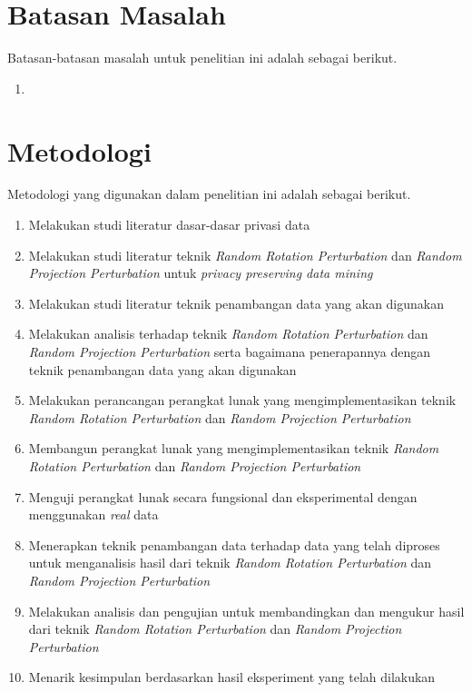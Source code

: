 \section{Batasan Masalah}
\label{sec:batasan}
Batasan-batasan masalah untuk penelitian ini adalah sebagai berikut.
\begin{enumerate}
    \item 
\end{enumerate}


\section{Metodologi}
\label{sec:metlit}
Metodologi yang digunakan dalam penelitian ini adalah sebagai berikut.
\begin{enumerate}
    \item Melakukan studi literatur dasar-dasar privasi data
    \item Melakukan studi literatur teknik \textit{Random Rotation Perturbation} dan \textit{Random Projection Perturbation} untuk \textit{privacy preserving data mining}
    \item Melakukan studi literatur teknik penambangan data yang akan digunakan
    \item Melakukan analisis terhadap teknik \textit{Random Rotation Perturbation} dan \textit{Random Projection Perturbation} serta bagaimana penerapannya dengan teknik penambangan data yang akan digunakan
    \item Melakukan perancangan perangkat lunak yang mengimplementasikan teknik \textit{Random Rotation Perturbation} dan \textit{Random Projection Perturbation}
    \item Membangun perangkat lunak yang mengimplementasikan teknik \textit{Random Rotation Perturbation} dan \textit{Random Projection Perturbation}
    \item Menguji perangkat lunak secara fungsional dan eksperimental dengan menggunakan \textit{real} data
    \item Menerapkan teknik penambangan data terhadap data yang telah diproses untuk menganalisis hasil dari teknik \textit{Random Rotation Perturbation} dan \textit{Random Projection Perturbation}
    \item Melakukan analisis dan pengujian untuk membandingkan dan mengukur hasil dari teknik \textit{Random Rotation Perturbation} dan \textit{Random Projection Perturbation}
    \item Menarik kesimpulan berdasarkan hasil eksperiment yang telah dilakukan
\end{enumerate}

